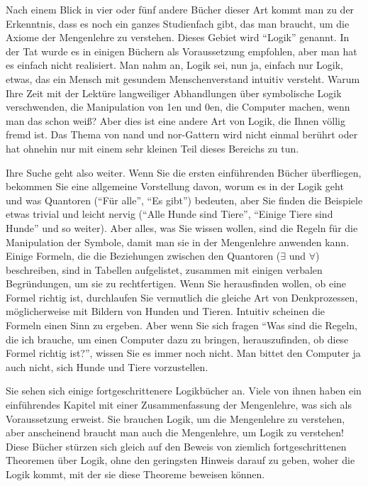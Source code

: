 Nach einem Blick in vier oder fünf andere Bücher dieser Art kommt man zu der Erkenntnis, dass es noch ein ganzes Studienfach gibt, das man braucht, um die Axiome der Mengenlehre zu verstehen.  Dieses Gebiet wird "`Logik"' genannt.  In der Tat wurde es in einigen Büchern als Voraussetzung empfohlen, aber man hat es einfach nicht realisiert.  Man nahm an, Logik sei, nun ja, einfach nur Logik, etwas, das ein Mensch mit gesundem Menschenverstand intuitiv versteht.  Warum Ihre Zeit mit der Lektüre langweiliger Abhandlungen über symbolische Logik verschwenden, die Manipulation von 1en und 0en, die Computer machen, wenn man das schon weiß?  Aber dies ist eine andere Art von Logik, die Ihnen völlig fremd ist.  Das Thema von {\sc nand} und {\sc nor}-Gattern wird nicht einmal berührt oder hat ohnehin nur mit einem sehr kleinen Teil dieses Bereichs zu tun.

Ihre Suche geht also weiter.  Wenn Sie die ersten einführenden Bücher überfliegen, bekommen Sie eine allgemeine Vorstellung davon, worum es in der Logik geht und was Quantoren ("`Für alle"', "`Es gibt"') bedeuten, aber Sie finden die Beispiele etwas trivial und leicht nervig ("`Alle Hunde sind Tiere"', "`Einige Tiere sind Hunde"' und so weiter).  Aber alles, was Sie wissen wollen, sind die Regeln für die Manipulation der Symbole, damit man sie in der Mengenlehre anwenden kann.  Einige Formeln, die die Beziehungen zwischen den Quantoren ($\exists$ und $\forall$) beschreiben, sind in Tabellen aufgelistet, zusammen mit einigen verbalen Begründungen, um sie zu rechtfertigen.
Wenn Sie herausfinden wollen, ob eine Formel richtig ist, durchlaufen Sie vermutlich die gleiche Art von Denkprozessen, möglicherweise mit Bildern von Hunden und Tieren.  Intuitiv scheinen die Formeln einen Sinn zu ergeben.  Aber wenn Sie sich fragen "`Was sind die Regeln, die ich brauche, um einen Computer dazu zu bringen, herauszufinden, ob diese Formel richtig ist?"', wissen Sie es immer noch nicht.  Man bittet den Computer ja auch nicht, sich Hunde und Tiere vorzustellen.

Sie sehen sich einige fortgeschrittenere Logikbücher an.  Viele von ihnen haben ein einführendes Kapitel mit einer Zusammenfassung der Mengenlehre, was sich als Voraussetzung erweist.  Sie brauchen Logik, um die Mengenlehre zu verstehen, aber anscheinend braucht man auch die Mengenlehre, um Logik zu verstehen!  Diese Bücher stürzen sich gleich auf den Beweis von ziemlich fortgeschrittenen Theoremen über Logik, ohne den geringsten Hinweis darauf zu geben, woher die Logik kommt, mit der sie diese Theoreme beweisen können.

